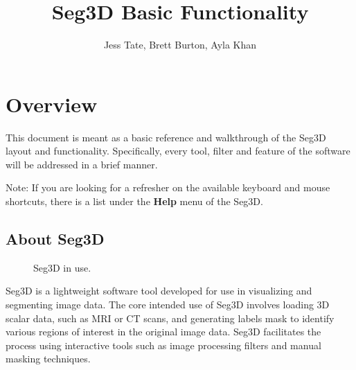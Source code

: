 \documentclass[fleqn,11pt,openany]{book}
\title{Seg3D Basic Functionality}
\author{Jess Tate, Brett Burton, Ayla Khan}
\begin{document}
\maketitle


\chapter{Overview}
\label{sec:overview}

\begin{introduction}
This document is meant as a basic reference and walkthrough of the Seg3D layout and functionality.  Specifically, every tool, filter and feature of the software will be addressed in a brief manner.

Note:  If you are looking for a refresher on the available keyboard and mouse shortcuts, there is a list under the \textbf{Help} menu of the Seg3D.  
\end{introduction}

\section{About Seg3D}

\begin{figure}
\caption{Seg3D in use.}\label{fig:layout}
\end{figure}

Seg3D is a lightweight software tool developed for use in visualizing and segmenting image data.
The core intended use of Seg3D involves loading 3D scalar data, such as MRI or CT scans, and generating labels mask to identify various regions of interest in the original image data.  Seg3D facilitates the process using interactive tools such as image processing filters and manual masking techniques.  
\end{document}
